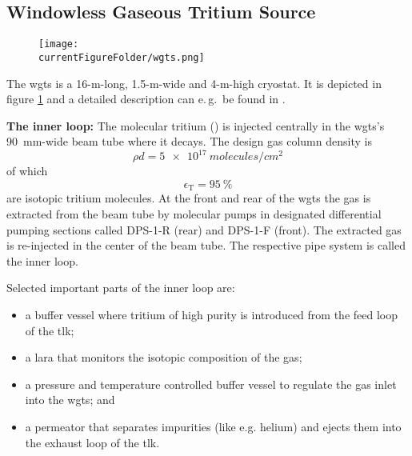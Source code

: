 \subsection{Windowless Gaseous Tritium Source}
\label{sec:katrinExpSetupWGTS}
\begin{figure}
    \centering
    \texttt{[image: \\currentFigureFolder/wgts.png]}
    \label{fig:katrinExpSetupWGTS}
\end{figure}%
The \gls{wgts} is a 16-m-long, 1.5-m-wide and 4-m-high cryostat. It is depicted in figure \ref{fig:katrinExpSetupWGTS} and a detailed description can e.\,g.~be found in \cite{Grohman2008}.
{\par \textbf{The inner loop:} The molecular tritium () is injected centrally in the \gls{wgts}'s \SI{90}{mm}-wide beam tube where it decays. The design gas column density is 
\begin{equation}
    \label{eq:columnDensity}
    \rho d = \SI{5e17}{molecules/{cm}^2}
\end{equation}
of which \begin{equation}
    \epsilon_\text{T} = \SI{95}{\percent}
\end{equation}
are isotopic tritium molecules. At the front and rear of the \gls{wgts} the gas is extracted from the beam tube by molecular pumps in designated differential pumping sections called DPS-1-R (rear) and DPS-1-F (front). The extracted gas is re-injected in the center of the beam tube. The respective pipe system is called the inner loop.
\begin{samepage}
Selected important parts of the inner loop are:
\begin{itemize}
\renewcommand{\labelitemi}{$\bullet$}
    \item a buffer vessel where tritium of high purity is introduced from the feed loop of the \gls{tlk};
    \item a \gls{lara} that monitors the isotopic composition of the gas;
    \item a pressure and temperature controlled buffer vessel to regulate the gas inlet into the \gls{wgts}; and
    \item a permeator that separates impurities (like e.g. helium) and ejects them into the exhaust loop of the \gls{tlk}.
\end{itemize}
\end{samepage}}


